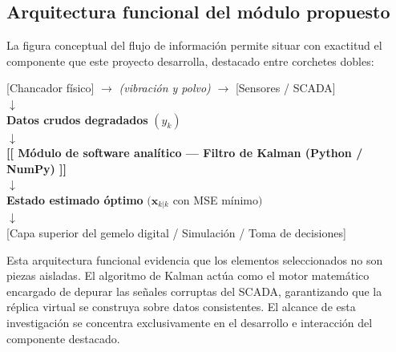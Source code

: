 \subsection{Arquitectura funcional del módulo propuesto}

La figura conceptual del flujo de información permite situar con exactitud el
componente que este proyecto desarrolla, destacado entre corchetes dobles:

\begin{center}
\singlespacing
\small
{}[Chancador físico] $\rightarrow$ \emph{(vibración y polvo)} $\rightarrow$
[Sensores / SCADA]\\
$\downarrow$\\
\textbf{Datos crudos degradados} $(y_k)$\\
$\downarrow$\\
\textbf{[[ Módulo de software analítico --- Filtro de Kalman (Python / NumPy) ]]}\\
$\downarrow$\\
\textbf{Estado estimado óptimo} $(\hat{\mathbf{x}}_{k|k}$ con MSE mínimo$)$\\
$\downarrow$\\{}
[Capa superior del gemelo digital / Simulación / Toma de decisiones]
\end{center}

Esta arquitectura funcional evidencia que los elementos seleccionados no son
piezas aisladas. El algoritmo de Kalman actúa como el motor matemático encargado
de depurar las señales corruptas del SCADA, garantizando que la réplica virtual
se construya sobre datos consistentes. El alcance de esta investigación se
concentra exclusivamente en el desarrollo e interacción del componente
destacado.
